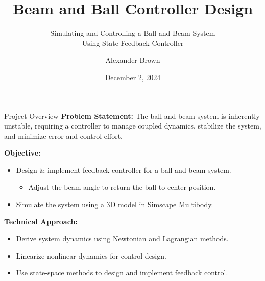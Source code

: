 \documentclass{beamer}
\title{Beam and Ball Controller Design}
\subtitle{Simulating and Controlling a Ball-and-Beam System \\Using State Feedback Controller}
\author{Alexander Brown}
\date{December 2, 2024}
\institute{EE486 - Final Project}
\begin{document}
\begin{frame}
    \titlepage
\end{frame}

\begin{frame}{Project Overview}
    \textbf{Problem Statement:} 
    The ball-and-beam system is inherently unstable, requiring a controller to manage coupled dynamics, stabilize the system, and minimize error and control effort.

    \vspace{0.5cm}
    \textbf{Objective:} 
    \begin{itemize} 
        \item Design \& implement feedback controller for a ball-and-beam system.
	\begin{itemize}
		\item Adjust the beam angle to return the ball to center position.
	\end{itemize}
        \item Simulate the system using a 3D model in Simscape Multibody.
    \end {itemize}

    \vspace{0.5cm}
    \textbf{Technical Approach:}
    \begin{itemize}
        \item Derive system dynamics using Newtonian and Lagrangian methods.
        \item Linearize nonlinear dynamics for control design.
        \item Use state-space methods to design and implement feedback control.
    \end{itemize}
\end{frame}
\end{document}
